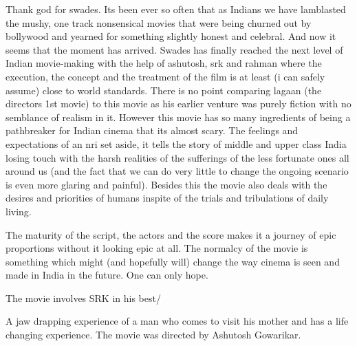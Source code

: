 \documentclass{article}
\begin{document}
Thank god for swades. Its been ever so often that as Indians we have lamblasted the mushy, one track nonsensical movies that were being churned out by bollywood and yearned for something slightly honest and celebral. And now it seems that the moment has arrived. Swades has finally reached the next level of Indian movie-making with the help of ashutosh, srk and rahman where the execution, the concept and the treatment of the film is at least (i can safely assume) close to world standards. There is no point comparing lagaan (the directors 1st movie) to this movie as his earlier venture was purely fiction with no semblance of realism in it. However this movie has so many ingredients of being a pathbreaker for Indian cinema that its almost scary. The feelings and expectations of an nri set aside, it tells the story of middle and upper class India losing touch with the harsh realities of the sufferings of the less fortunate ones all around us (and the fact that we can do very little to change the ongoing scenario is even more glaring and painful). Besides this the movie also deals with the desires and priorities of humans inspite of the trials and tribulations of daily living.

The maturity of the script, the actors and the score makes it a journey of epic proportions without it looking epic at all. The normalcy of the movie is something which might (and hopefully will) change the way cinema is seen and made in India in the future. One can only hope.

The movie involves SRK in his best/

A jaw drapping experience of a man who comes to visit his mother and has a life changing experience.
The movie was directed by Ashutosh Gowarikar.
\end{document}

